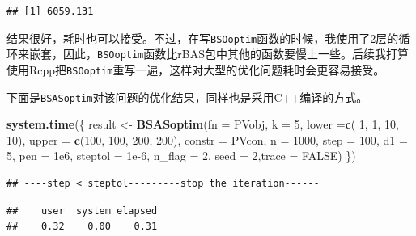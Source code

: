 \documentclass[]{ctexbook}
\newenvironment{Shaded}{\begin{snugshade}}{\end{snugshade}}
\newcommand{\KeywordTok}[1]{\textcolor[rgb]{0.13,0.29,0.53}{\textbf{#1}}}
\newcommand{\DataTypeTok}[1]{\textcolor[rgb]{0.13,0.29,0.53}{#1}}
\newcommand{\DecValTok}[1]{\textcolor[rgb]{0.00,0.00,0.81}{#1}}
\newcommand{\FloatTok}[1]{\textcolor[rgb]{0.00,0.00,0.81}{#1}}
\newcommand{\StringTok}[1]{\textcolor[rgb]{0.31,0.60,0.02}{#1}}
\newcommand{\OtherTok}[1]{\textcolor[rgb]{0.56,0.35,0.01}{#1}}
\newcommand{\OperatorTok}[1]{\textcolor[rgb]{0.81,0.36,0.00}{\textbf{#1}}}
\newcommand{\NormalTok}[1]{#1}
\theoremstyle{definition}
\theoremstyle{definition}
\theoremstyle{definition}
\theoremstyle{remark}
\begin{document}
\begin{verbatim}
## [1] 6059.131
\end{verbatim}

结果很好，耗时也可以接受。不过，在写\texttt{BSOoptim}函数的时候，我使用了2层的循环来嵌套，因此，\texttt{BSOoptim}函数比rBAS包中其他的函数要慢上一些。后续我打算使用Rcpp把\texttt{BSOoptim}重写一遍，这样对大型的优化问题耗时会更容易接受。

下面是\texttt{BSASoptim}对该问题的优化结果，同样也是采用C++编译的方式。

\begin{Shaded}
\begin{Highlighting}[]
\KeywordTok{system.time}\NormalTok{(\{}
\NormalTok{  result <-}\StringTok{ }\KeywordTok{BSASoptim}\NormalTok{(}\DataTypeTok{fn =}\NormalTok{ PVobj,}
                      \DataTypeTok{k =} \DecValTok{5}\NormalTok{,}
                      \DataTypeTok{lower =}\KeywordTok{c}\NormalTok{( }\DecValTok{1}\NormalTok{, }\DecValTok{1}\NormalTok{, }\DecValTok{10}\NormalTok{, }\DecValTok{10}\NormalTok{),}
                      \DataTypeTok{upper =} \KeywordTok{c}\NormalTok{(}\DecValTok{100}\NormalTok{, }\DecValTok{100}\NormalTok{, }\DecValTok{200}\NormalTok{, }\DecValTok{200}\NormalTok{),}
                      \DataTypeTok{constr =}\NormalTok{ PVcon,}
                      \DataTypeTok{n =} \DecValTok{1000}\NormalTok{,}
                      \DataTypeTok{step =} \DecValTok{100}\NormalTok{,}
                      \DataTypeTok{d1 =} \DecValTok{5}\NormalTok{,}
                      \DataTypeTok{pen =} \FloatTok{1e6}\NormalTok{,}
                      \DataTypeTok{steptol =} \FloatTok{1e-6}\NormalTok{,}
                      \DataTypeTok{n_flag =} \DecValTok{2}\NormalTok{,}
                      \DataTypeTok{seed =} \DecValTok{2}\NormalTok{,}\DataTypeTok{trace =} \OtherTok{FALSE}\NormalTok{)}
\NormalTok{\})}
\end{Highlighting}
\end{Shaded}

\begin{verbatim}
## ----step < steptol---------stop the iteration------
\end{verbatim}

\begin{verbatim}
##    user  system elapsed 
##    0.32    0.00    0.31
\end{verbatim}

\begin{Shaded}
\end{Shaded}
\end{document}
